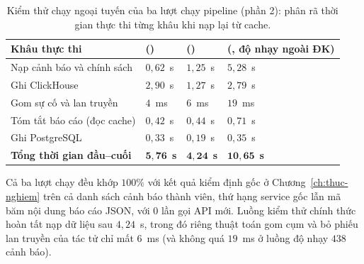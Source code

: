 \begin{table}[H]
  \centering
  \caption[Kiểm thử chạy ngoại tuyến: phân rã thời gian thực thi đầu--cuối]{Kiểm thử chạy ngoại tuyến của ba lượt chạy pipeline (phần 2): phân rã thời gian thực thi từng khâu khi nạp lại từ cache.}
  \label{tab:ch6-kiem-thu-thoigian}
  \tblfont
  \tblsetup
  \setlength{\tabcolsep}{3.5pt}
  \begin{tabularx}{\linewidth}{|Y|>{\raggedright\arraybackslash}p{3.0cm}|>{\raggedright\arraybackslash}p{3.1cm}|>{\raggedright\arraybackslash}p{3.4cm}|}
    \hline
    \textbf{Khâu thực thi} & \textbf{ ()} & \textbf{ ()} & \textbf{ (, độ nhạy ngoài ĐK)} \\
    \hline
    Nạp cảnh báo và chính sách & $0{,}62$~s & $1{,}25$~s & $5{,}28$~s \\
    \hline
    Ghi ClickHouse & $2{,}90$~s & $1{,}27$~s & $2{,}79$~s \\
    \hline
    Gom sự cố và lan truyền & $4$~ms & $6$~ms & $19$~ms \\
    \hline
    Tóm tắt báo cáo (đọc cache) & $0{,}42$~s & $0{,}44$~s & $0{,}71$~s \\
    \hline
    Ghi PostgreSQL & $0{,}33$~s & $0{,}19$~s & $0{,}35$~s \\
    \hline
    \textbf{Tổng thời gian đầu--cuối} & $\mathbf{5{,}76}$~\textbf{s} & $\mathbf{4{,}24}$~\textbf{s} & $\mathbf{10{,}65}$~\textbf{s} \\
    \hline
  \end{tabularx}
\end{table}

Cả ba lượt chạy đều khớp $100\%$ với kết quả kiểm định gốc ở Chương~\ref{ch:thuc-nghiem} trên cả danh sách cảnh báo thành viên, thứ hạng service gốc lẫn mã băm nội dung báo cáo JSON, với $0$ lần gọi API mới. Luồng kiểm thử chính thức  hoàn tất nạp dữ liệu sau $4{,}24$~s, trong đó riêng thuật toán gom cụm và bỏ phiếu lan truyền của tác tử  chỉ mất $6$~ms (và không quá $19$~ms ở luồng độ nhạy $438$ cảnh báo).

